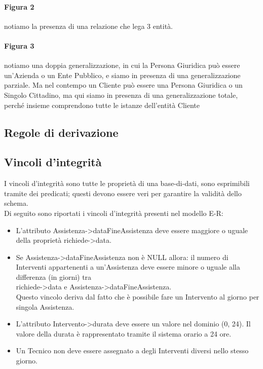\documentclass[legalpaper]{article}
\begin{document}
\paragraph{Figura 2}
notiamo la presenza di una relazione che lega 3 entità.
\paragraph{Figura 3}
notiamo una doppia generalizzazione, in cui la Persona Giuridica può essere un'Azienda o un
Ente Pubblico, e siamo in presenza di una generalizzazione parziale.
Ma nel contempo un Cliente può essere una Persona Giuridica o un Singolo Cittadino, ma qui siamo in
presenza di una generalizzazione totale, perché insieme comprendono tutte le istanze dell'entità Cliente
\newpage
\subsection{Regole di derivazione}


\subsection{Vincoli d'integrità}
I vincoli d'integrità sono tutte le proprietà di una base-di-dati, sono esprimibili 
tramite dei predicati; questi devono essere veri per garantire la validità dello schema.\\
\newline
Di seguito sono riportati i vincoli d'integrità presenti nel modello E-R:
\begin{itemize}
	\item L'attributo Assistenza->dataFineAssistenza deve essere maggiore o uguale\\ della proprietà richiede->data.
	\item Se Assistenza->dataFineAssistenza non è NULL allora: il numero di Interventi appartenenti a un'Assistenza deve essere minore o uguale alla differenza (in giorni) tra \\richiede->data e Assistenza->dataFineAssistenza.\\Questo vincolo deriva dal fatto che è possibile fare un Intervento al giorno per singola Assistenza.
	\item L'attributo Intervento->durata deve essere un valore nel dominio (0, 24).
	Il valore della durata è rappresentato tramite il sistema orario a 24 ore.
	\item Un Tecnico non deve essere assegnato a degli Interventi diversi nello stesso giorno.
	
\end{itemize}
\end{document}
